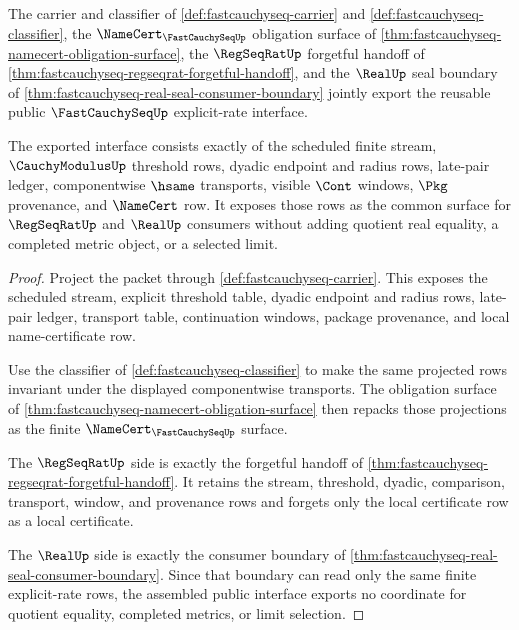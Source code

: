 \begin{theorem}
\label{thm:fastcauchyseq-public-explicit-rate-export}
The carrier and classifier of \autoref{def:fastcauchyseq-carrier} and
\autoref{def:fastcauchyseq-classifier}, the $\NameCert_{\FastCauchySeqUp}$
obligation surface of
\autoref{thm:fastcauchyseq-namecert-obligation-surface}, the $\RegSeqRatUp$
forgetful handoff of
\autoref{thm:fastcauchyseq-regseqrat-forgetful-handoff}, and the $\RealUp$
seal boundary of \autoref{thm:fastcauchyseq-real-seal-consumer-boundary}
jointly export the reusable public $\FastCauchySeqUp$ explicit-rate
interface.

The exported interface consists exactly of the scheduled finite stream,
$\CauchyModulusUp$ threshold rows, dyadic endpoint and radius rows, late-pair
ledger, componentwise $\hsame$ transports, visible $\Cont$ windows, $\Pkg$
provenance, and $\NameCert$ row. It exposes those rows as the common surface
for $\RegSeqRatUp$ and $\RealUp$ consumers without adding quotient real
equality, a completed metric object, or a selected limit.
\end{theorem}
\begin{proof}
Project the packet through \autoref{def:fastcauchyseq-carrier}. This exposes
the scheduled stream, explicit threshold table, dyadic endpoint and radius
rows, late-pair ledger, transport table, continuation windows, package
provenance, and local name-certificate row.

Use the classifier of \autoref{def:fastcauchyseq-classifier} to make the same
projected rows invariant under the displayed componentwise transports. The
obligation surface of \autoref{thm:fastcauchyseq-namecert-obligation-surface}
then repacks those projections as the finite $\NameCert_{\FastCauchySeqUp}$
surface.

The $\RegSeqRatUp$ side is exactly the forgetful handoff of
\autoref{thm:fastcauchyseq-regseqrat-forgetful-handoff}. It retains the
stream, threshold, dyadic, comparison, transport, window, and provenance rows
and forgets only the local certificate row as a local certificate.

The $\RealUp$ side is exactly the consumer boundary of
\autoref{thm:fastcauchyseq-real-seal-consumer-boundary}. Since that boundary
can read only the same finite explicit-rate rows, the assembled public
interface exports no coordinate for quotient equality, completed metrics, or
limit selection.
\end{proof}

